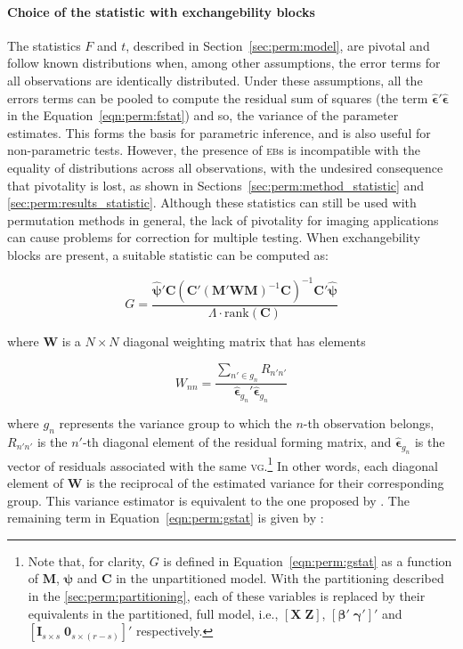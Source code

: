 \paragraph{Choice of the statistic with exchangebility blocks} The statistics $F$ and $t$, described in Section~\ref{sec:perm:model}, are pivotal and follow known distributions when, among other assumptions, the error terms for all observations are identically distributed. Under these assumptions, all the errors terms can be pooled to compute the residual sum of squares (the term $\boldsymbol{\hat{\epsilon}}'\boldsymbol{\hat{\epsilon}}$ in the Equation~\ref{eqn:perm:fstat}) and so, the variance of the parameter estimates. This forms the basis for parametric inference, and is also useful for non-parametric tests. However, the presence of \textsc{eb}s is incompatible with the equality of distributions across all observations, with the undesired consequence that pivotality is lost, as shown in Sections~\ref{sec:perm:method_statistic} and \ref{sec:perm:results_statistic}. Although these statistics can still be used with permutation methods in general, the lack of pivotality for imaging applications can cause problems for correction for multiple testing. When exchangebility blocks are present, a suitable statistic can be computed as:

\begin{equation}
G = \dfrac{\boldsymbol{\hat{\psi}}'\mathbf{C} \left(\mathbf{C}'(\mathbf{M}'\mathbf{W}\mathbf{M})^{-1}\mathbf{C} \right)^{-1} \mathbf{C}'\boldsymbol{\hat{\psi}}}{\Lambda \cdot \mathrm{rank}\left(\mathbf{C}\right)}
\label{eqn:perm:gstat}
\end{equation}

\noindent
where $\mathbf{W}$ is a $N \times N$ diagonal weighting matrix that has elements

\begin{equation}
W_{nn} = \dfrac{\sum_{n' \in g_{n}}R_{n'n'}}{\boldsymbol{\hat{\epsilon}}_{g_{n}}'\boldsymbol{\hat{\epsilon}}_{g_{n}}}
\end{equation}

\noindent where $g_{n}$ represents the variance group to which the $n$-th observation belongs, $R_{n'n'}$ is the $n'$-th diagonal element of the residual forming matrix, and $\boldsymbol{\hat{\epsilon}}_{g_{n}}$ is the vector of residuals associated with the same \textsc{vg}.\footnote{Note that, for clarity, $G$ is defined in Equation~\ref{eqn:perm:gstat} as a function of $\mathbf{M}$, $\boldsymbol{\psi}$ and $\mathbf{C}$ in the unpartitioned model. With the partitioning described in the \ref{sec:perm:partitioning}, each of these variables is replaced by their equivalents in the partitioned, full model, i.e., $[\mathbf{X} \; \mathbf{Z}]$, $[\boldsymbol{\beta}' \; \boldsymbol{\gamma}']'$ and $[\mathbf{I}_{s \times s}\;\mathbf{0}_{s \times (r-s)}]'$ respectively.} In other words, each diagonal element of $\mathbf{W}$ is the reciprocal of the estimated variance for their corresponding group. This variance estimator is equivalent to the one proposed by \citet{Horn1975}. The remaining term in Equation~\ref{eqn:perm:gstat} is given by \citep{Welch1951}:

